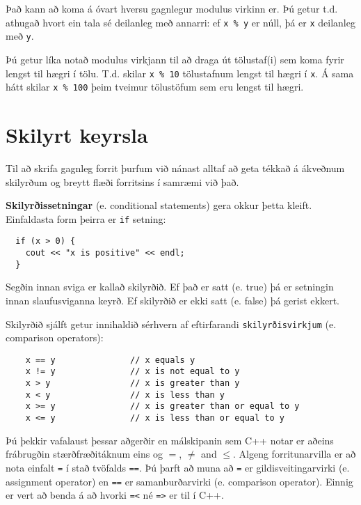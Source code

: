 Það kann að koma á óvart hversu gagnlegur modulus virkinn er.
Þú getur t.d. athugað hvort ein tala sé deilanleg með annarri:
ef {\tt x \% y} er núll, þá er {\tt x} deilanleg með {\tt y}.

Þú getur líka notað modulus virkjann til að draga út tölustaf(i) sem koma fyrir lengst til hægri í tölu.
T.d. skilar {\tt x \% 10} tölustafnum lengst til hægri í {\tt x}.
Á sama hátt skilar {\tt x \% 100} þeim tveimur tölustöfum sem eru lengst til hægri.

\section{Skilyrt keyrsla}

Til að skrifa gagnleg forrit þurfum við nánast alltaf að geta tékkað á ákveðnum skilyrðum og breytt flæði forritsins í samræmi við það.

{\bf Skilyrðissetningar} (e. conditional statements) gera okkur þetta kleift.
Einfaldasta form þeirra er {\tt if} setning:

\begin{verbatim}
  if (x > 0) {
    cout << "x is positive" << endl;
  }
\end{verbatim}
%
Segðin innan sviga er kallað skilyrðið.
Ef það er satt (e. true) þá er setningin innan slaufusviganna keyrð.
Ef skilyrðið er ekki satt (e. false) þá gerist ekkert.


Skilyrðið sjálft getur innihaldið sérhvern af eftirfarandi {\tt skilyrðisvirkjum} (e. comparison operators):

\begin{verbatim}
    x == y               // x equals y
    x != y               // x is not equal to y
    x > y                // x is greater than y
    x < y                // x is less than y
    x >= y               // x is greater than or equal to y
    x <= y               // x is less than or equal to y
\end{verbatim}
%
Þú þekkir vafalaust þessar aðgerðir en málskipanin sem C++ notar er aðeins frábrugðin stærðfræðitáknum eins og $=$, $\neq$ and $\le$.
Algeng forritunarvilla er að nota einfalt {\tt =} í stað tvöfalds {\tt ==}.
Þú þarft að muna að {\tt =} er gildisveitingarvirki (e. assignment operator) en {\tt ==} er samanburðarvirki (e. comparison operator).
Einnig er vert að benda á að hvorki {\tt =<} né {\tt =>} er til í C++.

